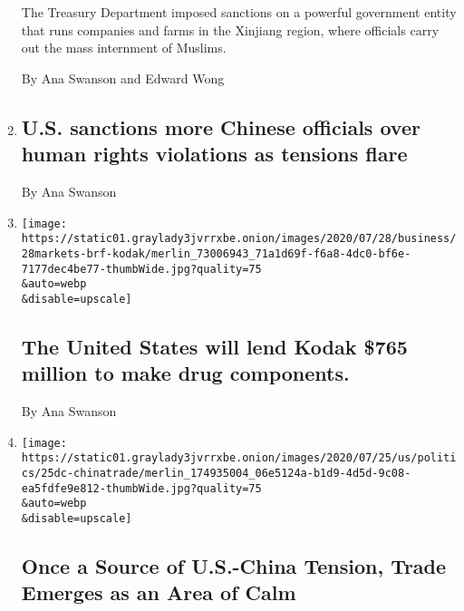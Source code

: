 \begin{enumerate}
  The Treasury Department imposed sanctions on a powerful government
  entity that runs companies and farms in the Xinjiang region, where
  officials carry out the mass internment of Muslims.

  By Ana Swanson and Edward Wong
\item
  \href{/live/2020/07/31/business/stock-market-today-coronavirus/us-sanctions-more-chinese-officials-over-human-rights-violations-as-tensions-flare}{}

  \hypertarget{us-sanctions-more-chinese-officials-over-human-rights-violations-as-tensions-flare}{%
  \subsection{U.S. sanctions more Chinese officials over human rights
  violations as tensions
  flare}\label{us-sanctions-more-chinese-officials-over-human-rights-violations-as-tensions-flare}}

  By Ana Swanson
\item
  \href{/live/2020/07/28/business/stock-market-today-coronavirus/the-united-states-will-lend-kodak-765-million-to-make-drug-components}{}

  \texttt{[image: https://static01.graylady3jvrrxbe.onion/images/2020/07/28/business/28markets-brf-kodak/merlin\_73006943\_71a1d69f-f6a8-4dc0-bf6e-7177dec4be77-thumbWide.jpg?quality=75\\\&auto=webp\\\&disable=upscale]}

  \hypertarget{the-united-states-will-lend-kodak-765-million-to-make-drug-components}{%
  \subsection{The United States will lend Kodak \$765 million to make
  drug
  components.}\label{the-united-states-will-lend-kodak-765-million-to-make-drug-components}}

  By Ana Swanson
\item
  \href{/2020/07/25/business/economy/us-china-trade-diplomacy.html}{}

  \texttt{[image: https://static01.graylady3jvrrxbe.onion/images/2020/07/25/us/politics/25dc-chinatrade/merlin\_174935004\_06e5124a-b1d9-4d5d-9c08-ea5fdfe9e812-thumbWide.jpg?quality=75\\\&auto=webp\\\&disable=upscale]}

  \hypertarget{once-a-source-of-us-china-tension-trade-emerges-as-an-area-of-calm}{%
  \subsection{Once a Source of U.S.-China Tension, Trade Emerges as an
  Area of
  Calm}\label{once-a-source-of-us-china-tension-trade-emerges-as-an-area-of-calm}}


\end{enumerate}
